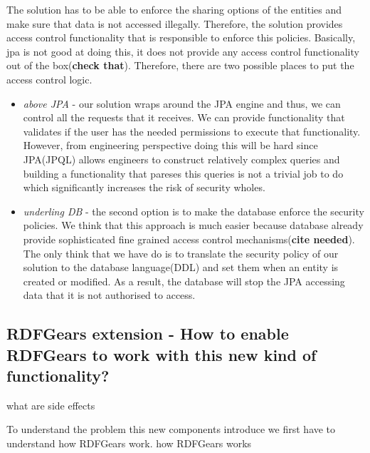 The solution has to be able to enforce the sharing options of the entities and make sure that data is not accessed illegally. Therefore, the solution provides access control functionality that is responsible to enforce this policies. Basically, jpa is not good at doing this, it does not provide any access control functionality out of the box(\textbf{check that}). Therefore, there are two possible places to put the access control logic. 

\begin{itemize}
	\item \textit{above JPA} - our solution wraps around the JPA engine and thus, we can control all the requests that it receives. We can provide functionality that validates if the user has the needed permissions to execute that functionality. However, from engineering perspective doing this will be hard since JPA(JPQL) allows engineers to construct relatively complex queries and building a functionality that pareses this queries is not a trivial job to do which significantly increases the risk of security wholes.
	
	\item \textit{underling DB} - the second option is to make the database enforce the security policies. We think that this approach is much easier because database already provide sophisticated fine grained access control mechanisms(\textbf{cite needed}). The only think that we have do is to translate the security policy of our solution to the database language(DDL) and set them when an entity is created or modified. As a result, the database will stop the JPA accessing data that it is not authorised to access.
\end{itemize}

\subsection{RDFGears extension - How to enable RDFGears to work with this new kind of functionality?}
what are side effects

To understand the problem this new components introduce we first have to understand how RDFGears work. 
how RDFGears works

